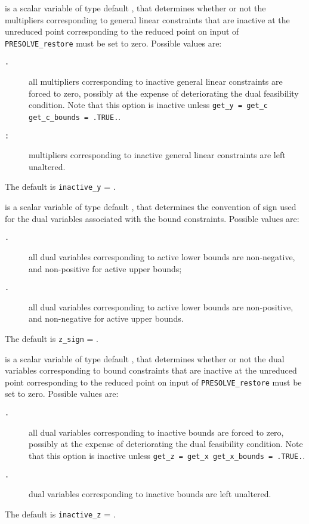 \documentclass{galahad}
\newcommand{\packagename}{PRESOLVE}
\newcommand{\sym}{\tt\small}
\begin{document}
\begin{description}
 is a scalar variable of type default \integer, that
determines whether or not the multipliers corresponding
to general linear constraints that are inactive at the unreduced point
corresponding to the reduced point on input of {\tt \packagename\_restore}
must be set to zero. Possible values are:
\begin{description}
\item[\sym \galsymforcetozero.] all multipliers corresponding to inactive 
                     general linear constraints are forced to zero,
                     possibly at the expense of deteriorating the
                     dual feasibility condition.
                     Note that this option is inactive unless
                     {\tt get\_y = get\_c get\_c\_bounds = .TRUE.}.
\item[\sym \galsymleaveasis:] multipliers corresponding to inactive 
                   general linear constraints are left unaltered.
\end{description}
The default is {\tt inactive\_y} = {\sym \galsymleaveasis}.

is a scalar variable of type default \integer, that
determines the convention of sign used for the dual 
variables associated with the bound constraints. Possible values are:
\begin{description}
\item[\sym \galsympositive.] all dual variables corresponding to 
                active lower bounds are non-negative, and
                non-positive for active upper bounds;
\item[\sym \galsymnegative.] all dual variables corresponding to 
                active lower bounds are non-positive, and
               non-negative for active upper bounds.
\end{description}
The default is {\tt z\_sign} = {\sym \galsympositive}.

 is a scalar variable of type default \integer, that
determines whether or not the dual variables corresponding
to bound constraints that are inactive at the unreduced point
corresponding to the reduced point on input of {\tt \packagename\_restore}
must be set to zero. Possible values are:
\begin{description}
\item[\sym \galsymforcetozero.] all dual variables corresponding to inactive 
                     bounds are forced to zero,
                     possibly at the expense of deteriorating the
                     dual feasibility condition.
                     Note that this option is inactive unless
                     {\tt get\_z = get\_x get\_x\_bounds = .TRUE.}.
\item[\sym \galsymleaveasis.] dual variables corresponding to inactive 
                   bounds are left unaltered.
\end{description}
The default is {\tt inactive\_z} = {\sym \galsymleaveasis}.


\end{description}
\end{document}
